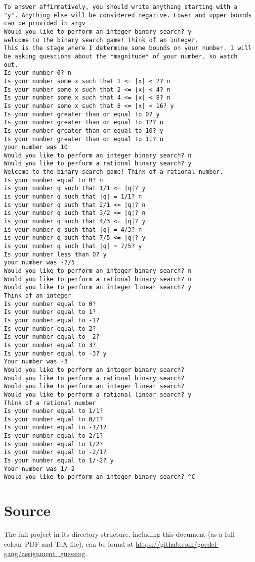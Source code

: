 \documentclass[fleqn,a4paper,11pt]{article}
\begin{document}
\begin{lstlisting}[caption=Typical session]
To answer affirmatively, you should write anything starting with a "y". Anything else will be considered negative. Lower and upper bounds can be provided in argv
Would you like to perform an integer binary search? y
welcome to the binary search game! Think of an integer.
This is the stage where I determine some bounds on your number. I will be asking questions about the *magnitude* of your number, so watch out.
Is your number 0? n
Is your number some x such that 1 <= |x| < 2? n
Is your number some x such that 2 <= |x| < 4? n
Is your number some x such that 4 <= |x| < 8? n
Is your number some x such that 8 <= |x| < 16? y
Is your number greater than or equal to 0? y
Is your number greater than or equal to 12? n
Is your number greater than or equal to 10? y
Is your number greater than or equal to 11? n
your number was 10
Would you like to perform an integer binary search? n
Would you like to perform a rational binary search? y
Welcome to the binary search game! Think of a rational number.
Is your number equal to 0? n
is your number q such that 1/1 <= |q|? y
is your number q such that |q| = 1/1? n
is your number q such that 2/1 <= |q|? n
is your number q such that 3/2 <= |q|? n
is your number q such that 4/3 <= |q|? y
is your number q such that |q| = 4/3? n
is your number q such that 7/5 <= |q|? y
is your number q such that |q| = 7/5? y
Is your number less than 0? y
your number was -7/5
Would you like to perform an integer binary search? n
Would you like to perform a rational binary search? n
Would you like to perform an integer linear search? y
Think of an integer
Is your number equal to 0?
Is your number equal to 1?
Is your number equal to -1?
Is your number equal to 2?
Is your number equal to -2?
Is your number equal to 3?
Is your number equal to -3? y
Your number was -3
Would you like to perform an integer binary search?
Would you like to perform a rational binary search?
Would you like to perform an integer linear search?
Would you like to perform a rational linear search? y
Think of a rational number
Is your number equal to 1/1?
Is your number equal to 0/1?
Is your number equal to -1/1?
Is your number equal to 2/1?
Is your number equal to 1/2?
Is your number equal to -2/1?
Is your number equal to 1/-2? y
Your number was 1/-2
Would you like to perform an integer binary search? ^C
\end{lstlisting}

    \section{Source}
    The full project in its directory structure, including this document (as a
    full-colour PDF and \TeX{} file), can be found at
    \url{https://github.com/goedel-gang/assignment_guessing}.
\end{document}
